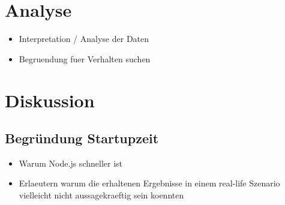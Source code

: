 \section{Analyse}
\begin{itemize}
  \item Interpretation / Analyse der Daten
  \item Begruendung fuer Verhalten suchen
\end{itemize}

\section{Diskussion}

\subsection{Begr\"undung Startupzeit}
\begin{itemize}
  \item Warum Node.js schneller ist
\end{itemize}

\begin{itemize}
  \item Erlaeutern warum die erhaltenen Ergebnisse in einem real-life Szenario vielleicht nicht aussagekraeftig sein koennten
\end{itemize}
